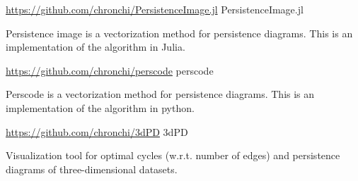 \begin{cventries}
\cventry
  {\url{https://github.com/chronchi/PersistenceImage.jl}} %
  {PersistenceImage.jl} %
  {}{}
  {
    \begin{cvitems} %
      \item {Persistence image is a vectorization method for persistence
      diagrams. This is an implementation of the algorithm in Julia.}
    \end{cvitems}
  }

\cventry
  {\url{https://github.com/chronchi/perscode}} %
  {perscode} %
  {}{}
  {
    \begin{cvitems} %
      \item {Perscode is a vectorization method for persistence
      diagrams. This is an implementation of the algorithm in python.}
    \end{cvitems}
  }

\cventry
  {\url{https://github.com/chronchi/3dPD}} %
  {3dPD} %
  {}{}
  {
    \begin{cvitems} %
        \item {Visualization tool for optimal cycles (w.r.t. number of edges) and persistence
	       diagrams of three-dimensional datasets.}
    \end{cvitems}
  }

\end{cventries}
